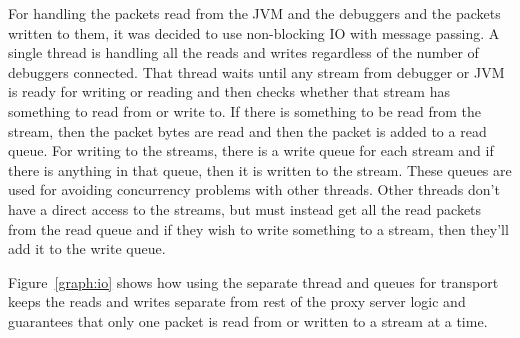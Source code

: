 \documentclass[..thesis.tex]{subfiles}
\begin{document}
For handling the packets read from the JVM and the debuggers and the packets written to them, it was decided to use non-blocking IO with message passing.
A single thread is handling all the reads and writes regardless of the number of debuggers connected.
That thread waits until any stream from debugger or JVM is ready for writing or reading and then checks whether that stream has something to read from or write to.
If there is something to be read from the stream, then the packet bytes are read and then the packet is added to a read queue.
For writing to the streams, there is a write queue for each stream and if there is anything in that queue, then it is written to the stream.
These queues are used for avoiding concurrency problems with other threads.
Other threads don't have a direct access to the streams, but must instead get all the read packets from the read queue and if they wish to write something to a stream, then they'll add it to the write queue.



Figure~\ref{graph:io} shows how using the separate thread and queues for transport keeps the reads and writes separate from rest of the proxy server logic and guarantees that only one packet is read from or written to a stream at a time.
\end{document}
